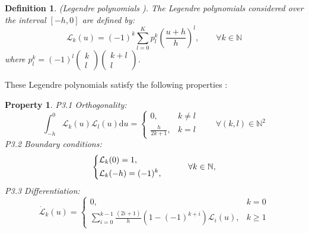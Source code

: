 \documentclass[a4paper]{cas-sc}
\newtheorem{defi}[theorem]{Definition}
\newtheorem{property}[theorem]{Property}
\begin{document}
\begin{defi}
  (Legendre polynomials \citep{dattoli2001note}). The Legendre polynomials considered over the interval $[ - h,0]$ are defined by:
  \begin{equation}
    {\mathcal{L}_k}(u) = {( - 1)^k}\sum\limits_{l = 0}^K {p_l^k} {\left( {\frac{{u + h}}{h}} \right)^l},\quad \quad \forall k \in \mathbb{N}
  \end{equation}
  where $p_l^k = {( - 1)^l}\left( {\begin{array}{*{20}{l}}
        k \\
        l
      \end{array}} \right)\left( {\begin{array}{*{20}{c}}
        {k + l} \\
        l
      \end{array}} \right)$.
\end{defi}

These Legendre polynomials satisfy the following properties \citep{bos2017orthogonality}:
\begin{property}

  \textit{P3.1} Orthogonality:
  \begin{equation}
    \int_{ - h}^0 {{\mathcal{L}_k}} (u){\mathcal{L}_l}(u){\text{d}}u = \left\{ {\begin{array}{*{20}{l}}
          {0,}                  & {k \ne l} \\
          {\frac{h}{{2k + 1}},} & {k = l}
        \end{array}} \right.\quad \quad \forall (k,l) \in {\mathbb{N}^2}
    \label{p3.1}
  \end{equation}
  \textit{P3.2} Boundary conditions:
  \begin{equation}
    \left\{ \begin{gathered}
      {\mathcal{L}_k}(0) = 1, \hfill \\
      {\mathcal{L}_k}( - h) = {( - 1)^k}, \hfill \\
    \end{gathered}  \right.\quad \quad \quad \forall k \in \mathbb{N},
    \label{p3.2}
  \end{equation}
  \textit{P3.3} Differentiation:
  \begin{equation}
    \dot{\mathcal{L}}_{k}(u)= \begin{cases}0, & k=0 \\ \sum_{i=0}^{k-1} \frac{(2 i+1)}{h}\left(1-(-1)^{k+i}\right) \mathcal{L}_{i}(u), & k \geq 1\end{cases}
    \label{p3.3}
  \end{equation}
\end{property}
\end{document}
